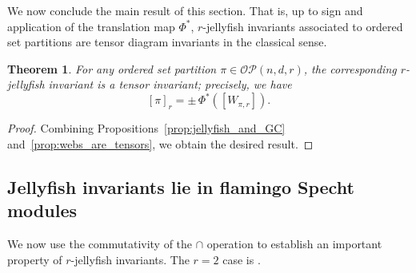 \documentclass[10pt]{amsart}
\theoremstyle{definition}
\theoremstyle{plain}
\theoremstyle{plain}
\theoremstyle{definition}
\theoremstyle{remark}
\theoremstyle{plain}
\newtheorem{theorem}[cdrthm]{Theorem}
\theoremstyle{plain}
\theoremstyle{plain}
\numberwithin{equation}{section}
\newcommand{\ordsetpart}{\mathcal{OP}}
\begin{document}
We now conclude the main result of this section.
That is, up to sign and application of the translation map $\Phi^*$, $r$-jellyfish invariants associated to ordered set partitions are tensor diagram invariants in the classical sense. 
\begin{theorem}
For any ordered set partition $\pi \in \ordsetpart(n,d,r)$, the corresponding $r$-jellyfish invariant is a tensor invariant; precisely, we have \[[\pi]_r = \pm \, \Phi^*([W_{\pi,r}]).\]
\end{theorem}
\begin{proof}
    Combining Propositions~\ref{prop:jellyfish_and_GC} and~\ref{prop:webs_are_tensors}, we obtain the desired result.
\end{proof}

\subsection{Jellyfish invariants lie in flamingo Specht modules}

We now use the commutativity of the $\cap$ operation to establish an important property of $r$-jellyfish invariants. The $r=2$ case is \cite[Lemma~3.14]{Patrias.Pechenik.Striker}.
\end{document}
